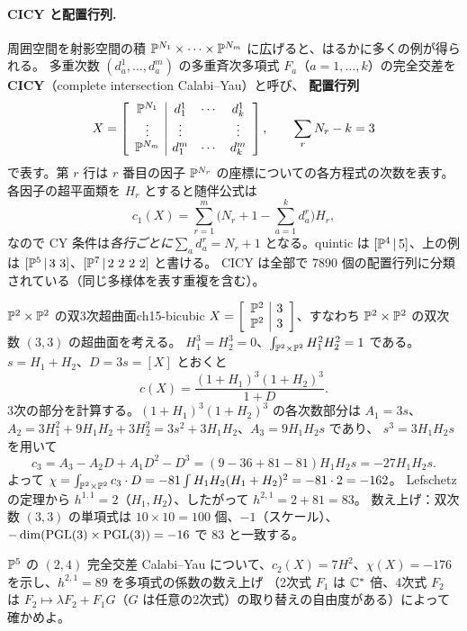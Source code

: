 \paragraph{CICY と配置行列.}
周囲空間を射影空間の積 $\mathbb{P}^{N_1}\times\cdots\times\mathbb{P}^{N_m}$ に広げると、はるかに多くの例が得られる。
多重次数 $(d^1_a,\dots,d^m_a)$ の多重斉次多項式 $F_a$（$a = 1,\dots,k$）の完全交差を\textbf{CICY}（complete intersection Calabi--Yau）と呼び、
\textbf{配置行列}
\[
X = \left[\begin{array}{c|ccc}
\mathbb{P}^{N_1} & d^1_1 & \cdots & d^1_k\\
\vdots & \vdots & & \vdots\\
\mathbb{P}^{N_m} & d^m_1 & \cdots & d^m_k
\end{array}\right],\qquad \sum_{r}N_r - k = 3
\]
で表す。第 $r$ 行は $r$ 番目の因子 $\mathbb{P}^{N_r}$ の座標についての各方程式の次数を表す。各因子の超平面類を $H_r$ とすると随伴公式は
\[
c_1(X) = \sum_{r=1}^m\Big(N_r+1-\sum_{a=1}^kd^r_a\Big)H_r,
\]
なので CY 条件は\emph{各行ごとに}$\sum_ad^r_a = N_r+1$ となる。quintic は $[\mathbb{P}^4\,|\,5]$、上の例は $[\mathbb{P}^5\,|\,3\ 3]$、$[\mathbb{P}^7\,|\,2\ 2\ 2\ 2]$ と書ける。
CICY は全部で 7890 個の配置行列に分類されている（同じ多様体を表す重複を含む）。

\begin{myex}{$\mathbb{P}^2\times\mathbb{P}^2$ の双3次超曲面}{ch15-bicubic}
$X = \left[\begin{array}{c|c}\mathbb{P}^2 & 3\\ \mathbb{P}^2 & 3\end{array}\right]$、すなわち $\mathbb{P}^2\times\mathbb{P}^2$ の双次数 $(3,3)$ の超曲面を考える。
$H_1^3 = H_2^3 = 0$、$\int_{\mathbb{P}^2\times\mathbb{P}^2}H_1^2H_2^2 = 1$ である。$s = H_1+H_2$、$D = 3s = [X]$ とおくと
\[
c(X) = \frac{(1+H_1)^3(1+H_2)^3}{1+D}.
\]
3次の部分を計算する。$(1+H_1)^3(1+H_2)^3$ の各次数部分は $A_1 = 3s$、$A_2 = 3H_1^2+9H_1H_2+3H_2^2 = 3s^2+3H_1H_2$、$A_3 = 9H_1H_2s$ であり、
$s^3 = 3H_1H_2s$ を用いて
\[
c_3 = A_3 - A_2D + A_1D^2 - D^3 = (9 - 36 + 81 - 81)H_1H_2s = -27H_1H_2s .
\]
よって $\chi = \int_{\mathbb{P}^2\times\mathbb{P}^2}c_3\cdot D = -81\int H_1H_2(H_1+H_2)^2 = -81\cdot2 = -162$。
Lefschetz の定理から $h^{1,1} = 2$（$H_1, H_2$）、したがって $h^{2,1} = 2+81 = 83$。
数え上げ：双次数 $(3,3)$ の単項式は $10\times10 = 100$ 個、$-1$（スケール）、$-\dim(\operatorname{PGL}(3)\times\operatorname{PGL}(3)) = -16$ で $83$ と一致する。
\end{myex}

$\mathbb{P}^5$ の $(2,4)$ 完全交差 Calabi--Yau について、$c_2(X) = 7H^2$、$\chi(X) = -176$ を示し、$h^{2,1} = 89$ を多項式の係数の数え上げ
（2次式 $F_1$ は $\mathbb{C}^*$ 倍、4次式 $F_2$ は $F_2\mapsto\lambda F_2 + F_1G$（$G$ は任意の2次式）の取り替えの自由度がある）によって確かめよ。

